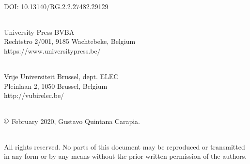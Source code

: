 \documentclass[english, british, BCOR=5mm, DIV=12, fontsize=10pt]{scrbook}
\begin{document}
\newpage{}

~\vfill{}

{\footnotesize{}DOI: 10.13140/RG.2.2.27482.29129}\\ %
{\footnotesize{}~}{\footnotesize\par}

{\footnotesize{}University Press BVBA}\\
{\footnotesize{}Rechtstro 2/001, 9185 Wachtebeke, Belgium }\\
{\footnotesize{}https://www.universitypress.be/}\\
{\footnotesize{}~}{\footnotesize\par}

{\footnotesize{}Vrije Universiteit Brussel, dept. ELEC}\\
{\footnotesize{}Pleinlaan 2, 1050 Brussel, Belgium}\\
{\footnotesize{}http://vubirelec.be/}\\
{\footnotesize{}~}{\footnotesize\par}


{\footnotesize{}$\copyright$ February 2020, Gustavo Quintana Carapia.}\\
{\footnotesize{}~}{\footnotesize\par}


{\footnotesize{}All rights reserved. No parts of this document may be reproduced or transmitted in any form or by any means without the prior written permission of the authors.}{\footnotesize\par}

{\footnotesize\par}

\newpage{}
{}

%

\tableofcontents{}
\end{document}
